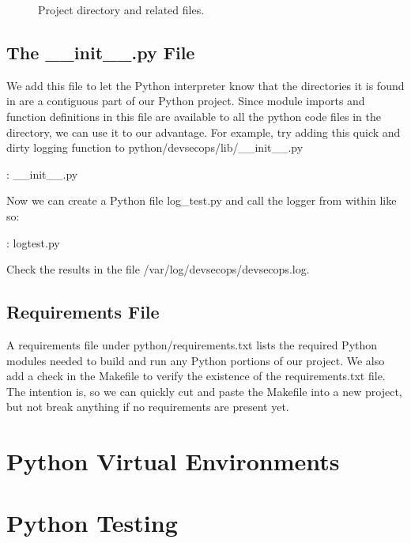 \begin{figure}[!htb]
	\centering
	
	\caption{Project directory and related files.}
	\label{pythonfiles}
\end{figure}

\subsection{The \_\_init\_\_.py File}

\justify{}
We add this file to let the Python interpreter know that the directories
it is found in are a contiguous part of our Python project. Since module
imports and function definitions in this file are available to all the
python code files in the directory, we can use it to our advantage. For
example, try adding this quick and dirty logging function to
python/devsecops/lib/\_\_init\_\_.py

\justify{}
\begin{mybox}{\thetcbcounter: \_\_init\_\_.py}
  
\end{mybox}

\justify{}
Now we can create a Python file log\_test.py and call the logger from within like so:

\begin{mybox}{\thetcbcounter: logtest.py}
  
\end{mybox}

\justify{}
Check the results in the file /var/log/devsecops/devsecops.log.

\subsection{Requirements File}

\justify{}
A requirements file under python/requirements.txt lists
the required Python modules needed to build and run any Python portions of our  project.
We also add a check in the Makefile to verify the existence of the requirements.txt file.
The intention is, so we can quickly cut and paste the Makefile into a new project, but
not break anything if no requirements are present yet.

\section{Python Virtual Environments}

\section{Python Testing}


